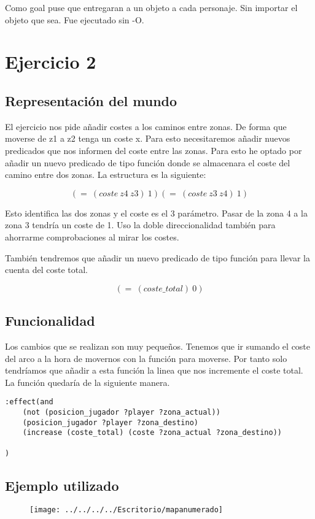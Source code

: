 \documentclass[]{article}
\begin{document}
Como goal puse que entregaran a un objeto a cada personaje. Sin importar el objeto que sea. Fue ejecutado sin -O.
\section{Ejercicio 2}
\subsection{Representación del mundo}
El ejercicio nos pide añadir costes a los caminos entre zonas. De forma que moverse de z1 a z2 tenga un coste x. Para esto necesitaremos añadir nuevos predicados que nos informen del coste entre las zonas. Para esto he optado por añadir un nuevo predicado de tipo función donde se almacenara el coste del camino entre dos zonas. La estructura es la siguiente:

$$
(=\ (coste\ z4\ z3)\ 1)
(=\ (coste\ z3\ z4)\ 1)
$$

Esto identifica las dos zonas y el coste es el 3 parámetro. Pasar de la zona 4 a la zona 3 tendría un coste de 1. Uso la doble direccionalidad también para ahorrarme comprobaciones al mirar los costes.

También tendremos que añadir un nuevo predicado de tipo función para llevar la cuenta del coste total. 

$$
(=\ (coste\_total)\ 0)
$$

\subsection{Funcionalidad}
Los cambios que se realizan son muy pequeños. Tenemos que ir sumando el coste del arco a la hora de movernos con la función para moverse. Por tanto solo tendríamos que añadir a esta función la linea que nos incremente el coste total. La función quedaría de la siguiente manera. 

\begin{lstlisting}
:effect(and 
	(not (posicion_jugador ?player ?zona_actual))
	(posicion_jugador ?player ?zona_destino)
	(increase (coste_total) (coste ?zona_actual ?zona_destino))

)
\end{lstlisting}

\subsection{Ejemplo utilizado}

\begin{figure}[H]
	\centering
	\texttt{[image: ../../../../Escritorio/mapanumerado]}
\end{figure}
\end{document}
